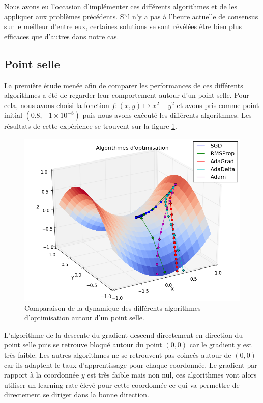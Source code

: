 Nous avons eu l'occasion d'implémenter ces différents algorithmes et de les appliquer aux problèmes précédents. S'il n'y a pas à l'heure actuelle de consensus sur le meilleur d'entre eux, certaines solutions se sont révélées être bien plus efficaces que d'autres dans notre cas.

\subsection{Point selle}

La première étude menée afin de comparer les performances de ces différents algorithmes a été de regarder leur comportement autour d'un point selle. Pour cela, nous avons choisi la fonction $f : (x, y) \mapsto x^2 - y^2$ et avons pris comme point initial $(0.8, -1\times10^{-8})$ puis nous avons exécuté les différents algorithmes. Les résultats de cette expérience se trouvent sur la figure \ref{point_selle}.

\begin{figure}[h!]
\begin{center}
\includegraphics[scale=0.5]{images/chapter8/comparaison_selle.png}
\caption{Comparaison de la dynamique des différents algorithmes d'optimisation autour d'un point selle.}
\label{point_selle}
\end{center}
\end{figure}

L'algorithme de la descente du gradient descend directement en direction du point selle puis se retrouve bloqué autour du point $(0, 0)$ car le gradient y est très faible. Les autres algorithmes ne se retrouvent pas coincés autour de $(0, 0)$ car ils adaptent le taux d'apprentissage pour chaque coordonnée. Le gradient par rapport à la coordonnée $y$ est très faible mais non nul, ces algorithmes vont alors utiliser un learning rate élevé pour cette coordonnée ce qui va permettre de directement se diriger dans la bonne direction.


